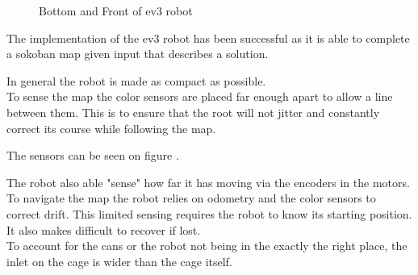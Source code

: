 \documentclass[../../main.tex]{subfiles}
\begin{document}
\begin{figure}[h]
	\centering

	\caption{Bottom and Front of ev3 robot}
	\label{fig:front_and_bottom}
\end{figure}

The implementation of the ev3 robot has been successful as it is able to complete a sokoban map given input that describes a solution.

In general the robot is made as compact as possible.\\


To sense the map the color sensors are placed far enough apart to allow a line between them.
This is to ensure that the root will not jitter and constantly correct its course while
following the map.

The sensors can be seen on figure .

The robot also able "sense" how far it has moving via the encoders in the motors.\\

To navigate the map the robot relies on odometry and the color sensors to correct drift.
This limited sensing requires the robot to know its starting position. It also makes difficult
to recover if lost.\\

To account for the cans or the robot  not being in the exactly the right place, the inlet on the cage
is wider than the cage itself.
	
\end{document}
